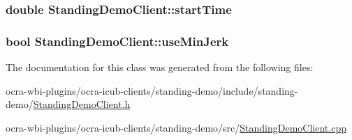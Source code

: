 \hypertarget{classStandingDemoClient_af05ac205216c20f9780f7e48a9ee4648}{
\subsubsection[{start\-Time}]{\setlength{\rightskip}{0pt plus 5cm}double {\bf \-Standing\-Demo\-Client\-::start\-Time}}}\label{classStandingDemoClient_af05ac205216c20f9780f7e48a9ee4648}
\hypertarget{classStandingDemoClient_a47132d5336d2e3b02085d2f153db6385}{
\subsubsection[{use\-Min\-Jerk}]{\setlength{\rightskip}{0pt plus 5cm}bool {\bf \-Standing\-Demo\-Client\-::use\-Min\-Jerk}}}\label{classStandingDemoClient_a47132d5336d2e3b02085d2f153db6385}


\-The documentation for this class was generated from the following files\-:\begin{DoxyCompactItemize}
\item 
ocra-\/wbi-\/plugins/ocra-\/icub-\/clients/standing-\/demo/include/standing-\/demo/\hyperlink{StandingDemoClient_8h}{\-Standing\-Demo\-Client.\-h}\item 
ocra-\/wbi-\/plugins/ocra-\/icub-\/clients/standing-\/demo/src/\hyperlink{StandingDemoClient_8cpp}{\-Standing\-Demo\-Client.\-cpp}\end{DoxyCompactItemize}
